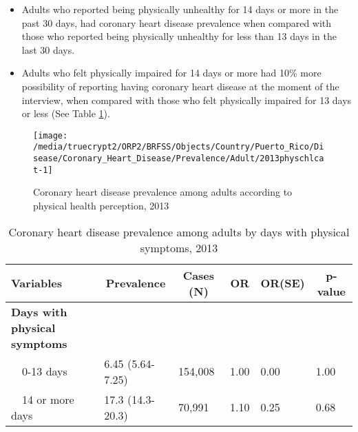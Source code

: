  
\newpage

 \newpage
\begin{itemize}

\item Adults who reported being physically unhealthy for 14 days or more in the past 30 days, had  coronary heart disease prevalence when compared with 
those who reported being physically unhealthy for less than 13 days in the last 30 days.


\item Adults who felt physically impaired for 14 days or more had 10\% more possibility of reporting having coronary heart disease at the moment of the interview, when compared with those who felt physically impaired for 13 days or less (See Table \ref{tab:phys.Coronary_Heart_Disease.2013}).

\end{itemize}

\begin{figure}[H]
\caption{Coronary heart disease prevalence among adults according to physical health perception, 2013}
\label{fig:phys.Coronary_Heart_Disease.2013}
\begin{knitrout}
\color{fgcolor}

{\centering \texttt{[image: /media/truecrypt2/ORP2/BRFSS/Objects/Country/Puerto\_Rico/Disease/Coronary\_Heart\_Disease/Prevalence/Adult/2013physchlcat-1]} 

}



\end{knitrout}
 \end{figure}

\begin{table}[H]
\caption{Coronary heart disease prevalence among adults by days with physical symptoms, 2013\label{tab:phys.Coronary_Heart_Disease.2013}} 
\begin{center}
\begin{tabular}{llllll}
\hline\hline
\multicolumn{1}{l}{Variables}&\multicolumn{1}{c}{Prevalence}&\multicolumn{1}{c}{Cases (N)}&\multicolumn{1}{c}{OR}&\multicolumn{1}{c}{OR(SE)}&\multicolumn{1}{c}{p-value}\tabularnewline
\hline
{\bfseries Days with physical symptoms}&&&&&\tabularnewline
~~0-13 days&6.45 (5.64-7.25)&154,008&1.00&0.00&1.00\tabularnewline
~~14 or more days&17.3 (14.3-20.3)& 70,991&1.10&0.25&0.68\tabularnewline
\hline
\end{tabular}\end{center}

\end{table}


